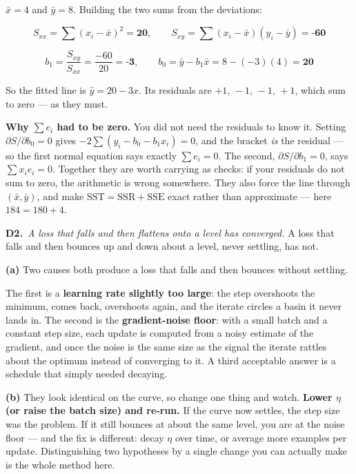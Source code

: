 \documentclass[10pt,a4paper]{article}
\newcommand{\sol}[1]{\textbf{#1}}
\begin{document}
\vspace{2pt}

$\bar x = 4$ and $\bar y = 8$. Building the two sums from the deviations:

\[ S_{xx} = \sum (x_i-\bar x)^2 = \sol{20}, \qquad S_{xy} = \sum (x_i-\bar x)(y_i-\bar y) = \sol{-60} \]

\[ b_1 = \frac{S_{xy}}{S_{xx}} = \frac{-60}{20} = \sol{-3}, \qquad b_0 = \bar y - b_1\bar x = 8 - (-3)(4) = \sol{20} \]

So the fitted line is $\hat y = 20 - 3 x$. Its residuals are $+1,\,-1,\,-1,\,+1$, which sum to zero --- as they must.

\vspace{2pt}

\textbf{Why $\sum e_i$ had to be zero.} You did not need the residuals to know it. Setting $\partial S/\partial b_0 = 0$ gives $-2\sum(y_i - b_0 - b_1x_i) = 0$, and the bracket \emph{is} the residual --- so the first normal equation says exactly $\sum e_i = 0$. The second, $\partial S/\partial b_1 = 0$, says $\sum x_ie_i = 0$. Together they are worth carrying as checks: if your residuals do not sum to zero, the arithmetic is wrong somewhere. They also force the line through $(\bar x, \bar y)$, and make $\mathrm{SST} = \mathrm{SSR} + \mathrm{SSE}$ exact rather than approximate --- here $184 = 180 + 4$.

\vspace{6pt}

\textbf{D2.}\ \emph{A loss that falls and then flattens onto a level has converged.} A loss that falls and then bounces up and down about a level, never settling, has not.

\vspace{2pt}

\textbf{(a)} Two causes both produce a loss that falls and then bounces without settling.\par\vspace{1mm}The first is a \textbf{learning rate slightly too large}: the step overshoots the minimum, comes back, overshoots again, and the iterate circles a basin it never lands in. The second is the \textbf{gradient-noise floor}: with a small batch and a constant step size, each update is computed from a noisy estimate of the gradient, and once the noise is the same size as the signal the iterate rattles about the optimum instead of converging to it. A third acceptable answer is a schedule that simply needed decaying.\par\vspace{1mm}\textbf{(b)} They look identical on the curve, so change one thing and watch. \textbf{Lower $\eta$ (or raise the batch size) and re-run.} If the curve now settles, the step size was the problem. If it still bounces at about the same level, you are at the noise floor --- and the fix is different: decay $\eta$ over time, or average more examples per update. Distinguishing two hypotheses by a single change you can actually make is the whole method here.
\end{document}
